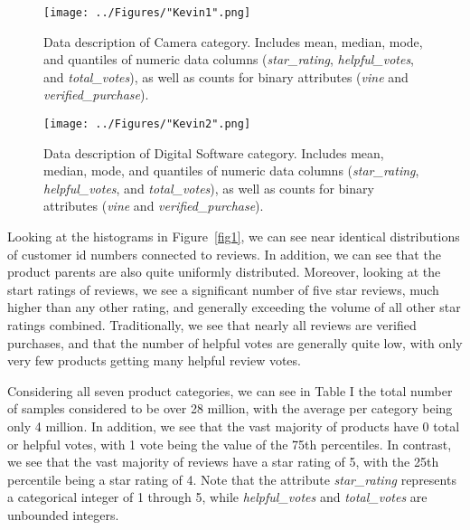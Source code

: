 \documentclass[10pt, conference, compsocconf]{IEEEtran}
\begin{document}
\begin{figure}[htb]
	\centering
	\texttt{[image: ../Figures/"Kevin1".png]}\\
	\vspace{0.04cm}
	\caption{Data description of Camera category. Includes mean, median, mode, and quantiles of numeric data columns (\textit{star\_rating}, \textit{helpful\_votes}, and \textit{total\_votes}), as well as counts for binary attributes (\textit{vine} and \textit{verified\_purchase}).}
	\vspace{0.01cm}
	\label{kev1}
\end{figure}

\begin{figure}[htb]
	\centering
	\texttt{[image: ../Figures/"Kevin2".png]}\\
	\vspace{0.04cm}
	\caption{Data description of Digital Software category. Includes mean, median, mode, and quantiles of numeric data columns (\textit{star\_rating}, \textit{helpful\_votes}, and \textit{total\_votes}), as well as counts for binary attributes (\textit{vine} and \textit{verified\_purchase}).}
	\vspace{0.01cm}
	\label{kev2}
\end{figure} 

Looking at the histograms in Figure~\ref{fig1}, we can see near identical distributions of customer id numbers connected to reviews. In addition, we can see that the product parents are also quite uniformly distributed. Moreover, looking at the start ratings of reviews, we see a significant number of five star reviews, much higher than any other rating, and generally exceeding the volume of all other star ratings combined. Traditionally, we see that nearly all reviews are verified purchases, and that the number of helpful votes are generally quite low, with only very few products getting many helpful review votes.

Considering all seven product categories, we can see in Table I the total number of samples considered to be over 28 million, with the average per category being only 4 million. In addition, we see that the vast majority of products have 0 total or helpful votes, with 1 vote being the value of the 75th percentiles. In contrast, we see that the vast majority of reviews have a star rating of 5, with the 25th percentile being a star rating of 4. Note that the attribute \textit{star\_rating} represents a categorical integer of 1 through 5, while \textit{helpful\_votes} and \textit{total\_votes} are unbounded integers. 
\end{document}
